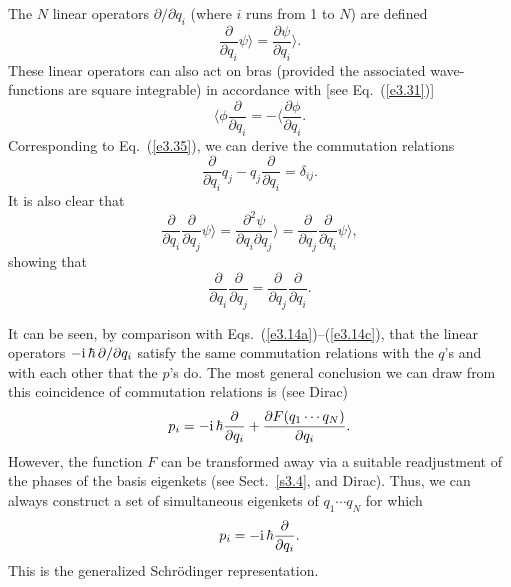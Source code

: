 The $N$ linear operators $\partial/\partial q_i$ (where $i$ runs from 1 to $N$)
are defined
\begin{equation}\label{e3.57}
\frac{\partial}{\partial q_i} \psi\rangle =\frac{\partial\psi}{\partial q_i}
\rangle.
\end{equation}
These linear operators can also act on bras (provided the associated wave-functions
are square integrable) in accordance with [see Eq.~(\ref{e3.31})]
\begin{equation}
\langle \phi \frac{\partial }{\partial q_i} = -\langle \frac{\partial \phi}
{\partial q_i}.
\end{equation}
Corresponding to Eq.~(\ref{e3.35}), we can derive the commutation relations
\begin{equation}
\frac{\partial}{\partial q_i} q_j - q_j \frac{\partial}{\partial q_i} = \delta_{ij}.
\end{equation}
It is also clear that
\begin{equation}
\frac{\partial}{\partial q_i}\frac{\partial}{\partial q_j} \psi\rangle
= \frac{\partial^2\psi}{\partial q_i \partial q_j} \rangle = \frac{\partial }{\partial
q_j} \frac{\partial }{\partial q_i} \psi\rangle,
\end{equation}
showing that
\begin{equation}
\frac{\partial}{\partial q_i}\frac{\partial}{\partial q_j} = 
\frac{\partial }{\partial q_j}
\frac{\partial }{\partial q_i}.
\end{equation}

It can be seen, by comparison with Eqs.~(\ref{e3.14a})--(\ref{e3.14c}), that the linear operators
$-{\rm i}\,\hbar\, \partial/\partial q_i$ satisfy the same commutation relations
with the $q$'s
and with each other that the $p$'s do. The most general conclusion
we can draw from this coincidence of commutation relations is (see Dirac)
\begin{equation}
p_i = -{\rm i} \,\hbar \frac{\partial}{\partial q_i} +
\frac{\partial  F(q_1\cdots q_N) }{\partial q_i}.
\end{equation}
However, the function $F$
 can be transformed away via  a suitable readjustment of the phases
of the basis eigenkets (see Sect.~\ref{s3.4}, and Dirac). Thus, we can always construct
a set of simultaneous eigenkets of $q_1\cdots q_N$ for  which
\begin{equation}\label{e3.63}
p_i = -{\rm i}\,\hbar \frac{\partial}{\partial q_i}.
\end{equation}
This is the generalized Schr\"{o}dinger representation. 

